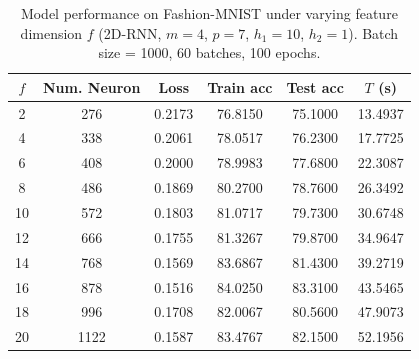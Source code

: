 \begin{table}[htbp]
\centering
\caption{Model performance on Fashion-MNIST under varying feature dimension $f$ (2D-RNN, $m=4$, $p=7$, $h_1=10$, $h_2=1$). Batch size = 1000, 60 batches, 100 epochs.}
\label{tab:fashion_mnist_f_sweep}
\begin{tabular}{cccccc}
\toprule
$f$ & Num. Neuron & Loss    & Train acc & Test acc & $T$ (s) \\
\midrule
2      & 276  & 0.2173 & 76.8150 &75.1000 & 13.4937  \\
4      & 338  & 0.2061 & 78.0517 &76.2300 & 17.7725  \\
6      & 408  & 0.2000 & 78.9983 &77.6800 & 22.3087  \\
8      & 486  & 0.1869 & 80.2700 &78.7600 & 26.3492  \\
10      & 572  & 0.1803 & 81.0717 &79.7300 & 30.6748  \\
12      & 666  & 0.1755 & 81.3267 &79.8700 & 34.9647  \\
14      & 768  & 0.1569 & 83.6867 &81.4300 & 39.2719  \\
16      & 878  & 0.1516 & 84.0250 &83.3100 & 43.5465  \\
18      & 996  & 0.1708 & 82.0067 &80.5600 & 47.9073  \\
20      & 1122  & 0.1587 & 83.4767 &82.1500 & 52.1956  \\
\bottomrule
\end{tabular}%
\end{table}
